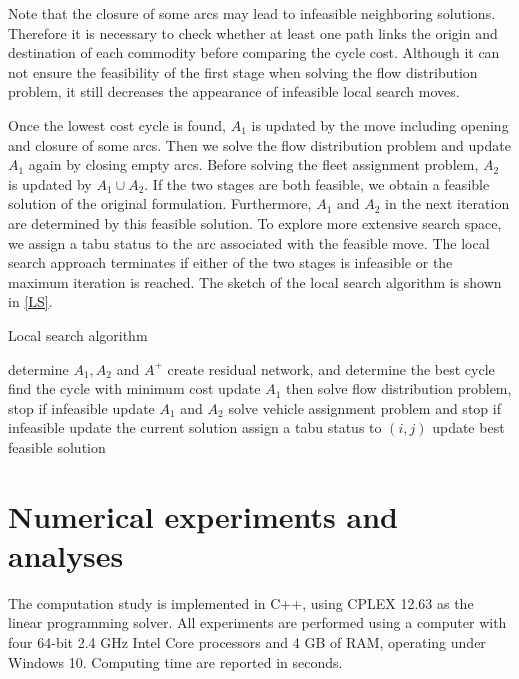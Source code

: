 \documentclass[11pt,nonblindrev,fleqn]{article}
\begin{document}
Note that the closure of some arcs may lead to infeasible neighboring solutions. Therefore it is necessary to check whether at least one path links the origin and destination of each commodity before comparing the cycle cost. Although it can not ensure the feasibility of the first stage when solving the flow distribution problem, it still decreases the appearance of infeasible local search moves.

Once the lowest cost cycle is found, $A_1$ is updated by the move including opening and closure of some arcs. Then we solve the flow distribution problem and update $A_1$ again by closing empty arcs. Before solving the fleet assignment problem, $A_2$ is updated by $A_1 \cup A_2$. If the two stages are both feasible, we obtain a feasible solution of the original formulation. Furthermore, $A_1$ and $A_2$ in the next iteration are determined by this feasible solution. To explore more extensive search space, we assign a tabu status to the arc associated with the feasible move. The local search approach terminates if either of the two stages is infeasible or the maximum iteration is reached. The sketch of the local search algorithm is shown in \autoref{LS}.

\begin{algorithm}[H]
\caption{Local search algorithm}\label{LS}
\LinesNumbered
\SetNlSkip{1.2em}
{
    determine $A_1,A_2$ and $A^+$\;
    {
        create residual network, and determine the best cycle\;
    }
    find the cycle with minimum cost\;
    update $A_1$ then solve flow distribution problem, stop if infeasible\;
    update $A_1$ and $A_2$\;
    solve vehicle assignment problem and stop if infeasible\;
    update the current solution\;
    assign a tabu status to $(i,j)$\;
    {
        update best feasible solution\;
    }
}
\end{algorithm}


\section{Numerical experiments and analyses}\label{experiment}
The computation study is implemented in C++, using CPLEX 12.63 as the linear programming solver. All experiments are performed using a computer with four 64-bit 2.4 GHz Intel Core processors and 4 GB of RAM, operating under Windows 10. Computing time are reported in seconds.
\end{document}
